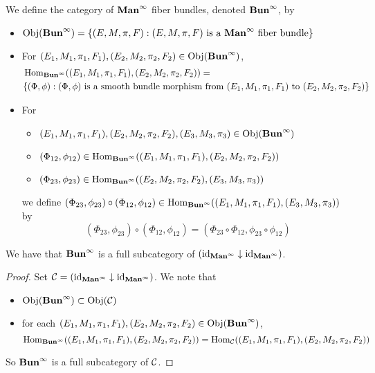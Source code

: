 \documentclass{book}
\begin{document}
	\begin{defn}
		We define the category of $\Maninf$ fiber bundles, denoted $\Buninf$, by 
		\begin{itemize}
			\item $\Obj(\Buninf) = \{(E, M, \pi, F): (E, M, \pi, F) \text{ is a $\Maninf$ fiber bundle}\}$ 
			\item For $(E_1, M_1, \pi_1, F_1), (E_2, M_2, \pi_2, F_2) \in \Obj(\Buninf)$, 
			\begin{align*}
				& \Hom_{\Buninf}((E_1, M_1, \pi_1, F_1), (E_2, M_2, \pi_2, F_2)) = \\
				& \{(\Phi, \phi): (\Phi, \phi) \text{ is a smooth bundle morphism from $(E_1, M_1, \pi_1, F_1)$ to $(E_2, M_2, \pi_2, F_2)$} \}
			\end{align*}
			\item For 
			\begin{itemize}
				\item $(E_1, M_1, \pi_1, F_1), (E_2, M_2, \pi_2, F_2), (E_3, M_3, \pi_3) \in \Obj(\Buninf)$ 
				\item $(\Phi_{12}, \phi_{12}) \in \Hom_{\Buninf}((E_1, M_1, \pi_1, F_1), (E_2, M_2, \pi_2, F_2))$
				\item $(\Phi_{23}, \phi_{23}) \in \Hom_{\Buninf}((E_2, M_2, \pi_2, F_2), (E_3, M_3, \pi_3))$ 
			\end{itemize}
			we define $(\Phi_{23}, \phi_{23}) \circ (\Phi_{12}, \phi_{12}) \in \Hom_{\Buninf}((E_1, M_1, \pi_1, F_1), (E_3, M_3, \pi_3))$ by 
			$$(\Phi_{23}, \phi_{23}) \circ (\Phi_{12}, \phi_{12}) = (\Phi_{23} \circ \Phi_{12}, \phi_{23} \circ \phi_{12})$$
		\end{itemize}
	\end{defn}

	\begin{ex}
		We have that $\Buninf$ is a full subcategory of $(\id_{\Maninf} \downarrow \id_{\Maninf})$.
	\end{ex}
	
	\begin{proof} Set $\MC = (\id_{\Maninf} \downarrow \id_{\Maninf})$. We note that 
		\begin{itemize}
			\item $\Obj(\Buninf) \subset \Obj(\MC)$
			\item for each $(E_1, M_1, \pi_1, F_1), (E_2, M_2, \pi_2, F_2) \in \Obj(\Buninf)$, 
			$$\Hom_{\Buninf}((E_1, M_1, \pi_1, F_1), (E_2, M_2, \pi_2, F_2)) = \Hom_{\MC}((E_1, M_1, \pi_1, F_1), (E_2, M_2, \pi_2, F_2))$$
		\end{itemize}
		So $\Buninf$ is a full subcategory of $\MC$.
	\end{proof}
\end{document}
